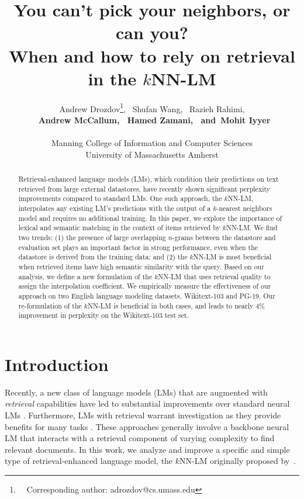 \documentclass[11pt]{article}
\title{You can't pick your neighbors, or can you? \\ When and how to rely on retrieval in the $k$NN-LM}
\author{Andrew Drozdov\thanks{~~Corresponding author: adrozdov@cs.umass.edu},
  ~Shufan Wang,
  ~Razieh Rahimi,\\
  {\bf ~Andrew McCallum,
  ~Hamed Zamani,
  ~and~Mohit Iyyer}\\
  \AND\\[-4ex]
Manning College of Information and Computer Sciences\\University of Massachusetts Amherst}
\date{}
\begin{document}
\maketitle
\begin{abstract}

Retrieval-enhanced language models (LMs), which condition their predictions on text retrieved from large external datastores, have recently shown significant perplexity improvements compared to standard LMs. One such approach, the $k$NN-LM, interpolates any existing LM's predictions with the output of a $k$-nearest neighbors model and requires no additional training. In this paper, we explore the importance of lexical and semantic matching in the context of items retrieved by $k$NN-LM. 
We find two trends: (1) the presence of large overlapping $n$-grams between the datastore and evaluation set plays an important factor in strong performance, even when the datastore is derived from the training data; and (2) the $k$NN-LM is most beneficial when retrieved items have high semantic similarity with the query.
Based on our analysis, we define a new formulation of the $k$NN-LM that uses retrieval quality to assign the interpolation coefficient. We empirically measure the effectiveness of our approach on two English language modeling datasets, Wikitext-103 and PG-19. Our re-formulation of the $k$NN-LM is beneficial in both cases, and leads to nearly 4\% improvement in perplexity on the Wikitext-103 test set.

\end{abstract}

\section{Introduction}


Recently, a new class of language models (LMs) that are augmented with \emph{retrieval} capabilities have led to substantial improvements over standard neural LMs \cite[inter alia]{Lewis2020RetrievalAugmentedGF,He2020LearningSP,Yogatama2021AdaptiveSL,Borgeaud2021ImprovingLM,Transformers2022MET,Thoppilan2022LaMDALM}.
Furthermore, LMs with retrieval warrant investigation as they provide benefits for many tasks \cite{Zamani2022REML}.
These approaches generally involve a backbone neural LM that interacts with a retrieval component of varying complexity to find relevant documents. In this work, we analyze and improve a specific and simple type of retrieval-enhanced language model, the $k$NN-LM originally proposed by~\citet{khandelwal20generalization}.
\end{document}
